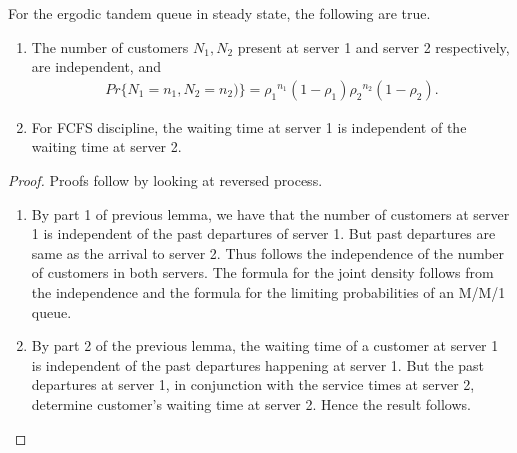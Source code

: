 \documentclass[a4paper,10pt,english]{article}
\begin{document}
\begin{thm}
For the ergodic tandem queue in steady state, the following are true.
\begin{enumerate}
\item The number of customers $N_1, N_2$ present at server 1 and server 2 respectively, are independent, and
\begin{align*}
Pr\{N_1 = n_1, N_2 = n_2)\}={\rho_1}^{n_1}(1-\rho_1){\rho_2}^{n_2}(1-\rho_2).
\end{align*}
\item For FCFS discipline, the waiting time at server 1 is independent of the waiting time at server 2.
\end{enumerate}
\end{thm}
\begin{proof}
Proofs follow by looking at reversed process.
\begin{enumerate}
\item By part 1 of previous lemma, we have that the number of customers at server 1 is independent of the past departures of server 1. But past departures are same as the arrival to server 2. Thus follows the independence of the number of customers in both servers. The formula for the joint density follows from the independence and the formula for the limiting probabilities of an M/M/1 queue. 
\item By part 2 of the previous lemma, the waiting time of a customer at server 1 is independent of the past departures happening at server 1. But the past departures at server 1, in conjunction with the service times at server 2, determine customer's waiting time at server 2. Hence the result follows.
\end{enumerate}
\end{proof}
\end{document}
